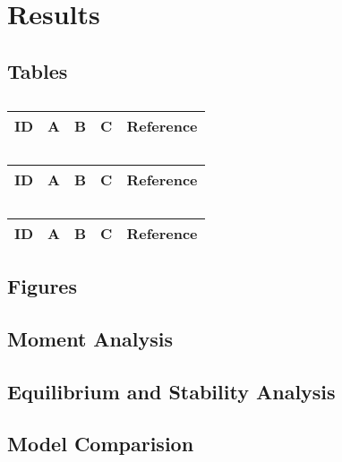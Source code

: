 \section{Results}

\subsection{Tables}

\centering
\begin{table}[H]\footnotesize
	\caption{}
	\begin{tabular}{rp{1cm}p{2cm}p{3cm}p{1cm}}
		\hline
		ID & A & B & C & Reference \\
		\hline
		\hline
	\end{tabular}
\end{table}
\raggedright

\centering
\begin{table}[H]\footnotesize
	\caption{}
	\begin{tabular}{rp{1cm}p{2cm}p{3cm}p{1cm}}
		\hline
		ID & A & B & C & Reference \\
		\hline
		\hline
	\end{tabular}
\end{table}
\raggedright

\centering
\begin{table}[H]\footnotesize
	\caption{}
	\begin{tabular}{rp{1cm}p{2cm}p{3cm}p{1cm}}
		\hline
		ID & A & B & C & Reference \\
		\hline
		\hline
	\end{tabular}
\end{table}
\raggedright

\subsection{Figures}

\subsection{Moment Analysis}
\subsection{Equilibrium and Stability Analysis}
\subsection{Model Comparision}


